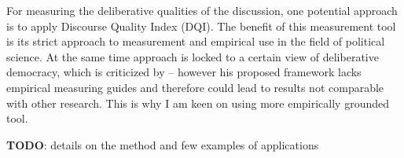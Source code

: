 \documentclass[journal,a4paper]{IEEEtran}
\begin{document}
For measuring the deliberative qualities of the discussion, one potential approach is to apply  Discourse Quality Index (DQI). The benefit of this measurement tool is its strict approach to measurement and empirical use in the field of political science. At the same time  approach is locked to a certain view of deliberative democracy, which is criticized by  -- however his proposed framework lacks empirical measuring guides and therefore could lead to results not comparable with other research. This is why I am keen on using more empirically grounded tool.

\textbf{TODO}: details on the method and few examples of applications



\end{document}
